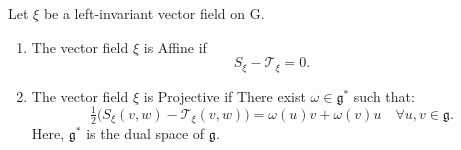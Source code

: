 \documentclass[10pt,a4paper]{amsart}
\begin{document}
\begin{Proposition} \label{propo}
Let $\xi$ be a left-invariant vector field on $\mathrm{G}$.
\begin{enumerate}
    \item The vector field $\xi$ is Affine if \begin{equation}
S_\xi-\mathscr{T}_\xi=0. \end{equation}
\item The vector field $\xi$ is Projective if There exist $\omega \in \mathfrak{g}^*$ such that:
\begin{equation}
   \tfrac12\big(S_\xi(v,w)-\mathscr{T}_\xi(v,w)\big)=\omega(u)v+\omega(v)u\quad \forall u,v\in \mathfrak{g}. \label{Aeq}
\end{equation}
Here, $\mathfrak{g}^*$ is the dual space of $\mathfrak{g}.$
\end{enumerate}
\end{Proposition} 
\end{document}
